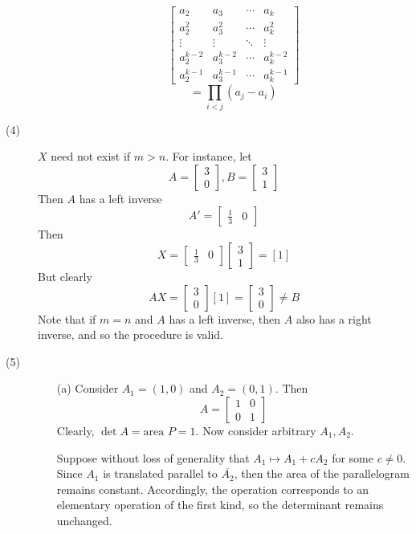 \documentclass[openany]{book}
\begin{document}
\begin{description}
\begin{itemize}
$$\begin{bmatrix}
a_2 & a_3 & \cdots & a_k \\
a_2^2 & a_3^2 & \cdots & a_k^2 \\
\vdots & \vdots & \ddots & \vdots \\
a_2^{k-2} & a_3^{k-2} & \cdots & a_k^{k-2} \\
a_2^{k-1} & a_3^{k-1} & \cdots & a_k^{k-1}
\end{bmatrix}$$
$$= \prod_{i < j}(a_j - a_i)$$
\end{itemize}
\item[(4)]
$X$ need not exist if $m > n$. For instance, let
$$A = \begin{bmatrix}
3 \\
0
\end{bmatrix}, B = \begin{bmatrix}
3 \\
1
\end{bmatrix}$$
Then $A$ has a left inverse
$$A' = \begin{bmatrix}
\frac{1}{3} & 0
\end{bmatrix}$$
Then
$$X = \begin{bmatrix}
\frac{1}{3} & 0
\end{bmatrix}\begin{bmatrix}
3 \\
1
\end{bmatrix} = [1]$$
But clearly
$$AX = \begin{bmatrix}
3 \\
0
\end{bmatrix}[1] = \begin{bmatrix}
3 \\
0
\end{bmatrix} \neq B$$
Note that if $m = n$ and $A$ has a left inverse, then $A$ also has a right inverse, and so the procedure is valid.
\item[(5)]
\begin{itemize}
\item[(a)]
Consider $A_1 = (1, 0)$ and $A_2 = (0, 1)$. Then
$$A = \begin{bmatrix}
1 & 0 \\
0 & 1
\end{bmatrix}$$
Clearly, $\det A = \text{area } P = 1$. Now consider arbitrary $A_1, A_2$. 

Suppose without loss of generality that $A_1 \mapsto A_1 + cA_2$ for some $c \neq 0$. Since $A_1$ is translated parallel to $\overline{A_2}$, then the area of the parallelogram remains constant. Accordingly, the operation corresponds to an elementary operation of the first kind, so the determinant remains unchanged.


\end{itemize}
\end{description}
\end{document}
